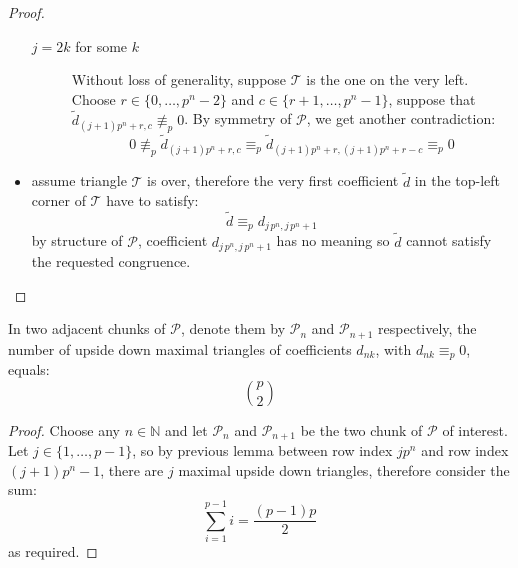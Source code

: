 \begin{proof}
\begin{itemize}
\begin{description}
                \item[$j=2k$ for some $k$] Without loss of generality, suppose  $\mathcal{T}$ is the one on the very left. 
                Choose $r \in\lbrace 0,\ldots,p^n-2\rbrace$ and $c \in\lbrace r+1,\ldots,p^n-1\rbrace$,
                suppose that $\tilde{d}_{(j+1) p^n +r, c}\not\equiv_{p}0$. 
                By symmetry of $\mathcal{P}$, we get another contradiction: 
                \begin{displaymath}
                    0\not\equiv_{p}\tilde{d}_{(j+1) p^n +r, c} \equiv_{p} \tilde{d}_{(j+1) p^n +r, (j+1) p^n +r-c}\equiv_{p}0
                \end{displaymath}
            \end{description}
        \item assume triangle $\mathcal{T}$ is over, therefore the very first coefficient 
            $\tilde{d}$ in the top-left corner of $\mathcal{T}$ have to satisfy:
            \begin{displaymath}
                 \tilde{d} \equiv_{p} d_{j\,p^{n},j\,p^{n}+1}
            \end{displaymath}
            by structure of $\mathcal{P}$, coefficient $d_{j\,p^{n},j\,p^{n}+1}$ has no
            meaning so $\tilde{d}$ cannot satisfy the requested congruence.
    \end{itemize}
\end{proof}


\begin{theorem}
    In two adjacent chunks of $\mathcal{P}$, denote them by $\mathcal{P}_n$
    and $\mathcal{P}_{n+1}$ respectively, the
    number of upside down maximal triangles of coefficients $d_{nk}$, with
    $d_{nk} \equiv_p 0$, equals:
    \begin{displaymath}
        {{p}\choose{2}}
    \end{displaymath}
\end{theorem}

\begin{proof}
    Choose any $n\in\mathbb{N}$ and let $\mathcal{P}_n$ and $\mathcal{P}_{n+1}$
    be the two chunk of $\mathcal{P}$ of interest. Let $j\in\lbrace 1, \ldots, p-1 \rbrace$, so
    by previous lemma between row index $j p^n$ and
    row index $(j+1)p^n -1$, there are $j$ maximal upside down triangles, therefore consider the sum:
    \begin{displaymath}
        \sum_{i=1}^{p-1}{i} = \frac{(p-1)p}{2}
    \end{displaymath}
    as required.

\end{proof}
